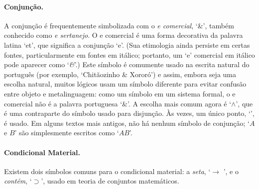 \paragraph{Conjunção.}
A conjunção é frequentemente simbolizada com o \emph{e comercial}, `{\&}', também conhecido como \emph{e sertanejo}. O e comercial é uma forma decorativa da palavra latina `et', que significa a conjunção `e'. (Sua etimologia ainda persiste em certas fontes, particularmente em fontes em itálico; portanto, um `e' comercial em itálico pode aparecer como `\emph{\&}'.) Este símbolo é comumente usado na escrita natural do português (por exemplo, `Chitãozinho \& Xororó') e assim, embora seja uma escolha natural, muitos lógicos usam um símbolo diferente para evitar confusão entre objeto e metalinguagem: como um símbolo em um sistema formal, o e comercial não é a palavra portuguesa `\&'. A escolha mais comum agora é `$\wedge$', que é uma contraparte do símbolo usado para disjunção. Às vezes, um único ponto, `{\scriptsize\textbullet}', é usado. Em alguns textos mais antigos, não há nenhum símbolo de conjunção; `$A$ e $B$' são simplesmente escritos como `$AB$'.

\paragraph{Condicional Material.} Existem dois símbolos comuns para o condicional material: a \emph{seta}, `$\rightarrow$ ', e o \emph{contém}, `$\supset$', usado em teoria de conjuntos matemáticos.

